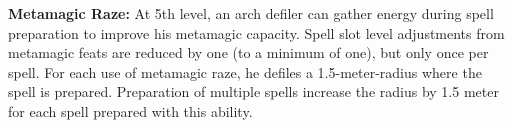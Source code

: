 {\textbf{Metamagic Raze:} At 5th level, an arch defiler can gather energy during spell preparation to improve his metamagic capacity. Spell slot level adjustments from metamagic feats are reduced by one (to a minimum of one), but only once per spell. For each use of metamagic raze, he defiles a 1.5-meter-radius where the spell is prepared. Preparation of multiple spells increase the radius by 1.5 meter for each spell prepared with this ability.






}
